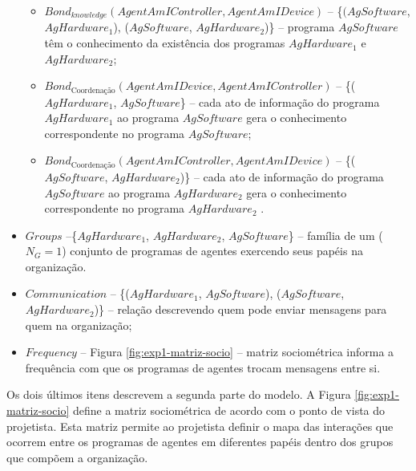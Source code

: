 \begin{itemize}
\begin{itemize}
        \item $Bond_{knowledge}(AgentAmIController, AgentAmIDevice)$ -- \{$(AgSoftware$, $AgHardware_1$), ($AgSoftware$, $AgHardware_2$)\} – programa $AgSoftware$ têm o conhecimento da existência dos programas $AgHardware_1$ e $AgHardware_2$;
        
        \item $Bond_{\textrm{Coordenação}}(AgentAmIDevice, AgentAmIController)$ -- \{($AgHardware_1$, $AgSoftware$\} – cada ato de informação do programa $AgHardware_1$ ao programa $AgSoftware$ gera o conhecimento correspondente no programa $AgSoftware$;
        
        \item $Bond_{\textrm{Coordenação}}(AgentAmIController, AgentAmIDevice)$ -- \{($AgSoftware$, $AgHardware_2$)\} – cada ato de informação do programa $AgSoftware$ ao programa $AgHardware_2$ gera o conhecimento correspondente no programa $AgHardware_2$
        .
    \end{itemize}
    
    \item $Groups$ --\{$AgHardware_1$, $AgHardware_2$, $AgSoftware$\} – família de um ($N_G = 1$) conjunto de programas de agentes exercendo seus papéis na organização.
    
    \item $Communication$ -- \{($AgHardware_1$, $AgSoftware$), ($AgSoftware$, $AgHardware_2$)\} – relação descrevendo quem pode enviar mensagens para quem na organização;
    
    \item $Frequency$ -- Figura \ref{fig:exp1-matriz-socio} – matriz sociométrica informa a frequência com que os programas de agentes trocam mensagens entre si.
    
\end{itemize}
    
    Os dois últimos itens descrevem a segunda parte do modelo. A Figura \ref{fig:exp1-matriz-socio} define a matriz sociométrica de acordo com o ponto de vista do projetista. Esta matriz permite ao projetista definir o mapa das interações que ocorrem entre os programas de agentes em diferentes papéis dentro dos grupos que compõem a organização. 
    
    \begin{figure}[h!]
        \centering
    \end{figure}
    
